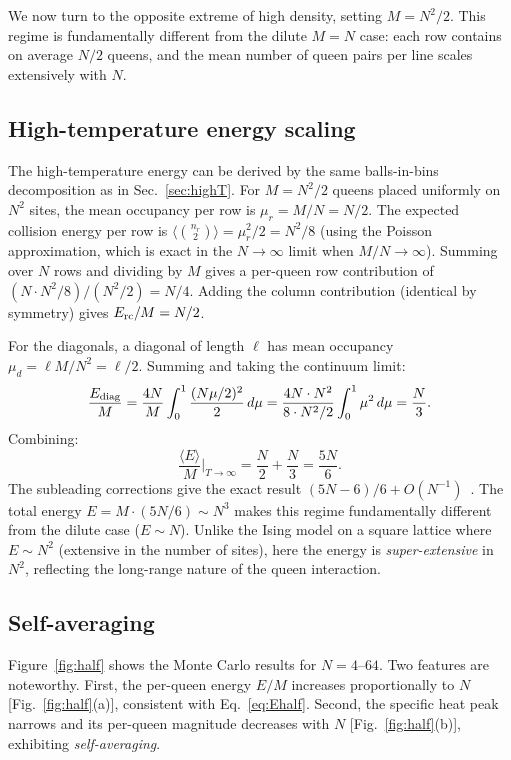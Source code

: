 \documentclass[aps, pre, reprint, amsmath, amssymb, superscriptaddress, floatfix]{revtex4-2}
\begin{document}
We now turn to the opposite extreme of high density, setting
$M = N^2/2$.  This regime is fundamentally different from the dilute
$M = N$ case: each row contains on average $N/2$ queens, and the mean
number of queen pairs per line scales extensively with $N$.

\subsection{High-temperature energy scaling}

The high-temperature energy can be derived by the same
balls-in-bins decomposition as in Sec.~\ref{sec:highT}.  For
$M = N^2/2$ queens placed uniformly on $N^2$ sites, the mean
occupancy per row is $\mu_r = M/N = N/2$.  The expected collision
energy per row is $\langle\binom{n_r}{2}\rangle = \mu_r^2/2 = N^2/8$
(using the Poisson approximation, which is exact in the $N \to \infty$
limit when $M/N \to \infty$).  Summing over $N$ rows and dividing by
$M$ gives a per-queen row contribution of
$(N \cdot N^2/8)/(N^2/2) = N/4$.
Adding the column contribution (identical by symmetry) gives
$E_{\rm rc}/M = N/2$.

For the diagonals, a diagonal of length $\ell$ has mean occupancy
$\mu_d = \ell M/N^2 = \ell/2$.  Summing and taking the continuum
limit:
\begin{equation}
  \frac{E_{\rm diag}}{M}
  = \frac{4N}{M}\int_0^1 \frac{(N\mu/2)^2}{2}\,d\mu
  = \frac{4N \cdot N^2}{8 \cdot N^2/2}\int_0^1 \mu^2\,d\mu
  = \frac{N}{3}.
  \label{eq:E_half_diag}
\end{equation}
Combining:
\begin{equation}
  \frac{\langle E\rangle}{M}\bigg|_{T \to \infty}
  = \frac{N}{2} + \frac{N}{3} = \frac{5N}{6}.
  \label{eq:Ehalf}
\end{equation}
The subleading corrections give the exact result
$(5N - 6)/6 + O(N^{-1})$~\cite{Polson2024}.
The total energy $E = M \cdot (5N/6) \sim N^3$ makes this regime
fundamentally different from the dilute case ($E \sim N$).
Unlike the Ising model on a square lattice where $E \sim N^2$
(extensive in the number of sites), here the energy is
\emph{super-extensive} in $N^2$, reflecting the long-range nature of
the queen interaction.

\subsection{Self-averaging}

Figure~\ref{fig:half} shows the Monte Carlo results for
$N = 4$--$64$.  Two features are noteworthy.  First, the per-queen
energy $E/M$ increases proportionally to $N$
[Fig.~\ref{fig:half}(a)], consistent with
Eq.~\eqref{eq:Ehalf}.  Second, the specific heat peak narrows
and its per-queen magnitude decreases with $N$
[Fig.~\ref{fig:half}(b)], exhibiting \textit{self-averaging}.
\end{document}
